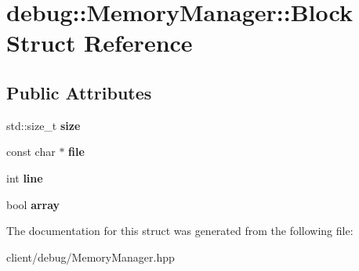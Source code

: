 \hypertarget{structdebug_1_1_memory_manager_1_1_block}{\section{debug\-:\-:Memory\-Manager\-:\-:Block Struct Reference}
\label{structdebug_1_1_memory_manager_1_1_block}
}
\subsection*{Public Attributes}
\begin{DoxyCompactItemize}
\item 
\hypertarget{structdebug_1_1_memory_manager_1_1_block_aa665cf473839ac8cf17b7f01177b3ada}{std\-::size\-\_\-t {\bfseries size}}\label{structdebug_1_1_memory_manager_1_1_block_aa665cf473839ac8cf17b7f01177b3ada}

\item 
\hypertarget{structdebug_1_1_memory_manager_1_1_block_a2a319c00929b3ca6ac51c80232a97c16}{const char $\ast$ {\bfseries file}}\label{structdebug_1_1_memory_manager_1_1_block_a2a319c00929b3ca6ac51c80232a97c16}

\item 
\hypertarget{structdebug_1_1_memory_manager_1_1_block_abc33f389d2a59991be03096d2e36eb8c}{int {\bfseries line}}\label{structdebug_1_1_memory_manager_1_1_block_abc33f389d2a59991be03096d2e36eb8c}

\item 
\hypertarget{structdebug_1_1_memory_manager_1_1_block_aded920449a80c59f488baa5e943fa24a}{bool {\bfseries array}}\label{structdebug_1_1_memory_manager_1_1_block_aded920449a80c59f488baa5e943fa24a}

\end{DoxyCompactItemize}


The documentation for this struct was generated from the following file\-:\begin{DoxyCompactItemize}
\item 
client/debug/Memory\-Manager.\-hpp\end{DoxyCompactItemize}
